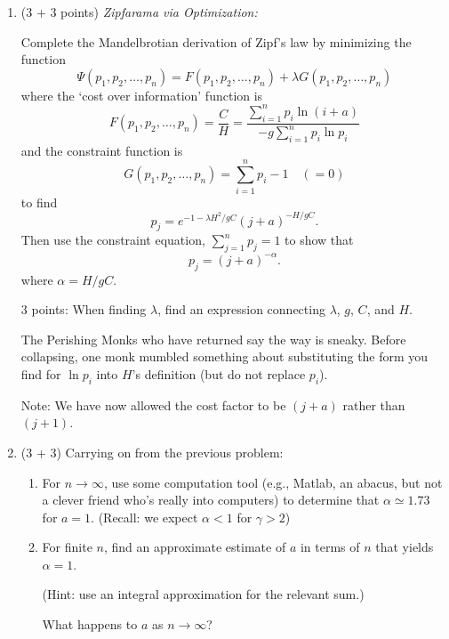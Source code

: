 \begin{enumerate}

   \solutionend

  

\item (3 + 3 points)
  \textit{Zipfarama via Optimization:}

  Complete the Mandelbrotian derivation of Zipf's law by
  minimizing the function
  $$
  \Psi(p_1,p_2,\ldots,p_n) = 
  F(p_1,p_2,\ldots,p_n) + \lambda G(p_1,p_2,\ldots,p_n)
  $$
  where the `cost over information' function is
  $$
  F(p_1,p_2,\ldots,p_n)
  = 
  \frac{C}{H}
  =
  \frac{\sum_{i=1}^n p_i \ln (i+a)}
       {-g\sum_{i=1}^n p_i \ln p_i}
       $$
       and the
       constraint function is
       $$
       G(p_1,p_2,\ldots,p_n) = \sum_{i=1}^n p_i - 1  \quad (= 0)
       $$
       to find
       $$
       p_j = e^{-1 -\lambda H^2/gC} (j+a)^{-H/gC}.
       $$
       Then use the constraint equation, $\sum_{j=1}^{n} p_j = 1$ 
       to show that 
       $$
       p_j = (j+a)^{-\alpha}.
       $$
       where $\alpha = H/gC$.

       3 points: When finding $\lambda$, find an expression
       connecting $\lambda$, $g$, $C$, and $H$.

       The Perishing Monks who have returned say the way is sneaky.
       Before collapsing, one monk mumbled something
       about substituting the form you find
       for $\ln p_i$ into $H$'s definition (but
       do not replace $p_i$).

       Note: We have now allowed the cost factor to be $(j+a)$
       rather than $(j+1)$. 

       
   \solutionstart


   \solutionend


     \item (3 + 3)
       Carrying on from the previous problem:

       \begin{enumerate}
       \item
         For $n \rightarrow \infty$, use some computation tool (e.g., Matlab, an abacus, 
         but not a clever friend who's really into computers) 
         to determine that $\alpha \simeq 1.73$ for $a=1$.
         (Recall: we expect $\alpha < 1$ for $\gamma > 2$)
       \item 
         For finite $n$, find an approximate estimate of $a$
         in terms of $n$ that yields $\alpha=1$.

         (Hint: use an integral approximation for the relevant sum.)

         What happens to $a$ as $n \rightarrow \infty$?
       \end{enumerate}


       
   \solutionstart


   \solutionend


\end{enumerate}

